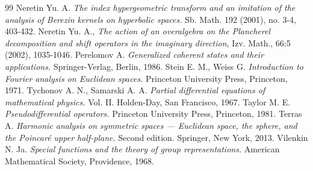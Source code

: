 \documentclass[10pt,a4paper]{amsart}
\begin{document}
\begin{thebibliography}{99}
 Neretin Yu. A. {\it The index hypergeometric transform and an imitation of the analysis of Berezin kernels on hyperbolic spaces.} Sb. Math. 192 (2001), no. 3-4, 403-432.
 Neretin Yu. A., {\it The action of an overalgebra on the Plancherel decomposition and shift operators in the imaginary direction}, Izv. Math., 66:5 (2002), 1035-1046. %
 Perelomov A. {\it Generalized coherent states and their applications.} Springer-Verlag, Berlin, 1986.
 Stein E. M., Weiss G. {\it Introduction to Fourier analysis on Euclidean spaces.} Princeton University Press, Princeton, 1971.
 Tychonov A. N., Samarski A. A. {\it Partial differential equations of mathematical physics.} Vol. II. Holden-Day, San Francisco, 1967.
 Taylor M. E. {\it Pseudodifferential operators.} Princeton University Press, Princeton, 1981.
 Terras A. {\it Harmonic analysis on symmetric spaces --- Euclidean space, the sphere, and the Poincar\'e upper half-plane.} Second edition. Springer, New York, 2013.
 Vilenkin N. Ja. {\it Special functions and the theory of group representations.} American Mathematical Society, Providence, 1968.
\end{thebibliography}
\end{document}
